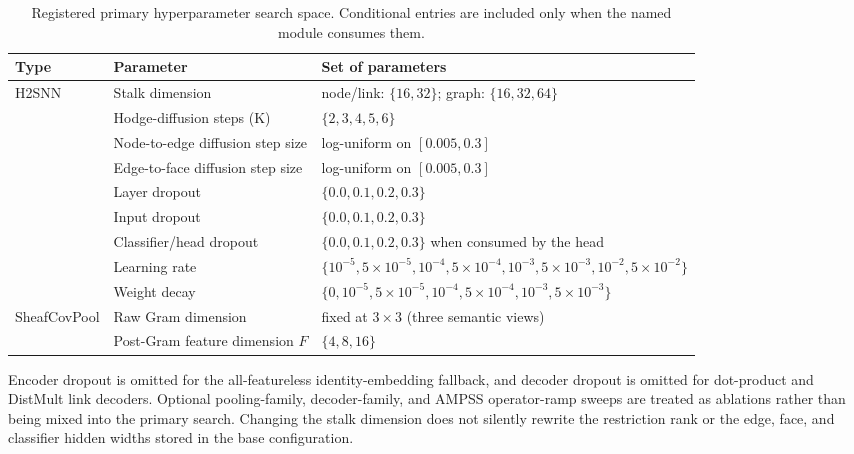 \documentclass[sigconf,anonymous,review]{acmart}
\begin{document}
\label{app:hyperparameters}

\begin{table}[htbp]
  \centering
  \caption{Registered primary hyperparameter search space. Conditional entries are included only when the named module consumes them.}
  \label{tab:hyperparameters}

  \begin{tabular}{lll}
    \toprule
    \textbf{Type}
    & \textbf{Parameter}
    & \textbf{Set of parameters} \\
    \midrule

    \multirow{9}{*}{H2SNN}
      & Stalk dimension
      & node/link: $\{16,32\}$; graph: $\{16,32,64\}$ \\
      & Hodge-diffusion steps (K)
      & $\{2,3,4,5,6\}$ \\
      & Node-to-edge diffusion step size
      & log-uniform on $[0.005,0.3]$ \\
      & Edge-to-face diffusion step size
      & log-uniform on $[0.005,0.3]$ \\
      & Layer dropout
      & $\{0.0,0.1,0.2,0.3\}$ \\
      & Input dropout
      & $\{0.0,0.1,0.2,0.3\}$ \\
      & Classifier/head dropout
      & $\{0.0,0.1,0.2,0.3\}$ when consumed by the head \\
      & Learning rate
      & $\{10^{-5},5{\times}10^{-5},10^{-4},5{\times}10^{-4},10^{-3},5{\times}10^{-3},10^{-2},5{\times}10^{-2}\}$ \\
      & Weight decay
      & $\{0,10^{-5},5{\times}10^{-5},10^{-4},5{\times}10^{-4},10^{-3},5{\times}10^{-3}\}$ \\

    \midrule

    \multirow{2}{*}{SheafCovPool}
      & Raw Gram dimension
      & fixed at $3{\times}3$ (three semantic views) \\
      & Post-Gram feature dimension $F$
      & $\{4,8,16\}$ \\

    \bottomrule
  \end{tabular}
\end{table}

Encoder dropout is omitted for the all-featureless identity-embedding fallback, and decoder
dropout is omitted for dot-product and DistMult link decoders. Optional pooling-family,
decoder-family, and AMPSS operator-ramp sweeps are treated as ablations rather than being
mixed into the primary search. Changing the stalk dimension does not silently rewrite the
restriction rank or the edge, face, and classifier hidden widths stored in the base configuration.
\end{document}
